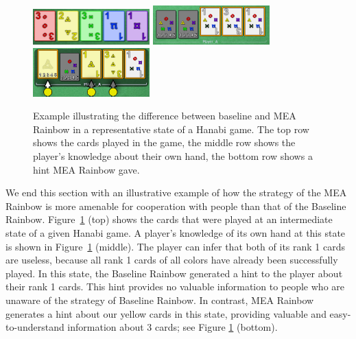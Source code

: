 \documentclass[letterpaper]{article} %
\begin{document}
\begin{figure}[t]
\centering
        \includegraphics[width=4.50cm]{cards already succefuly played.png}
        \includegraphics[width=4.50cm]{hand prior to hint.png}
        \includegraphics[width=4.50cm]{hand knowledge after hint.png}          
\caption{Example illustrating the difference  between baseline and MEA Rainbow in a representative state of a Hanabi game. The top row shows the cards played in the game, the middle row shows the player's knowledge about their own hand, the bottom row shows a hint MEA Rainbow gave.}
                           \label{fig:agents_example_comparison}
\end{figure}

We end this section with an illustrative example of how the strategy of the MEA Rainbow is more amenable for cooperation with people than that of the  Baseline Rainbow.
Figure~\ref{fig:agents_example_comparison} (top) shows the cards that were played at an intermediate state of a given Hanabi game.  A player's knowledge of its own hand at this state is shown in Figure~\ref{fig:agents_example_comparison} (middle). 
The player can infer that both of its rank 1 cards are useless, because all rank 1 cards of all colors have already been successfully played.  In this state, the  Baseline Rainbow generated a hint to the player   about their rank 1 cards. This hint provides no  valuable information to people who are unaware of the strategy of Baseline Rainbow. 
In contrast, MEA Rainbow generates a  hint about  our yellow cards in this state, providing valuable and easy-to-understand information about 3 cards; see Figure \ref{fig:agents_example_comparison} (bottom). 
\end{document}
